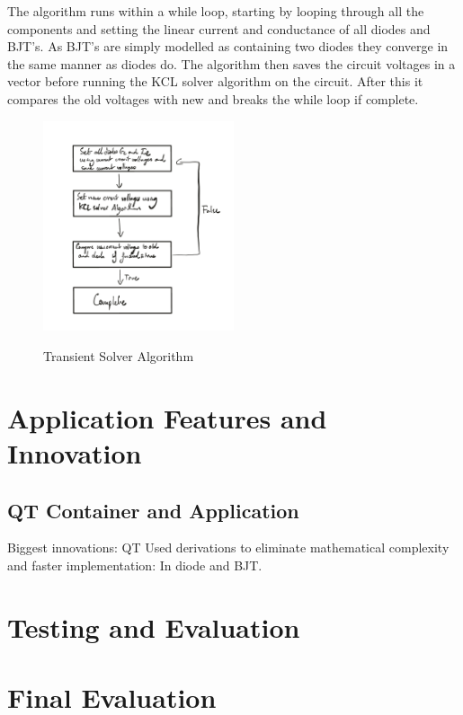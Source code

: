 \documentclass{article}
\begin{document}
The algorithm runs within a while loop, starting by looping through all the components and setting the linear current and conductance of all diodes and BJT's. As BJT's are simply modelled as containing two diodes they converge in the same manner as diodes do. The algorithm then saves the circuit voltages in a vector before running the KCL solver algorithm on the circuit. After this it compares the old voltages with new and breaks the while loop if complete.  

\begin{figure}[h]
    \caption{Transient Solver Algorithm}
    \centering
    \includegraphics[width=0.5\textwidth]{images/TransientSolverAlgorithm.png}
    \label{fig:transient}
\end{figure}

\newpage

\section{Application Features and Innovation}
\subsection{QT Container and Application}
Biggest innovations: 
QT
Used derivations to eliminate mathematical complexity and faster implementation: In diode and BJT. 



\section{Testing and Evaluation}

\section{Final Evaluation}
\end{document}
